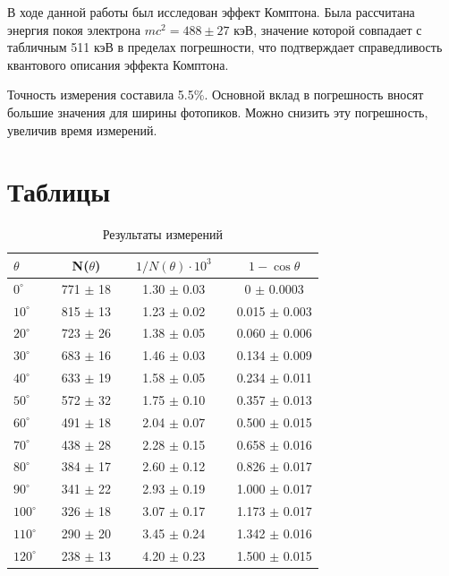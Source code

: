 \documentclass[reprint, nofootinbib, nobalancelastpage, 10pt]{revtex4-2}
\begin{document}
В ходе данной работы был исследован эффект Комптона. Была рассчитана энергия покоя
электрона $mc^2 = 488 \pm 27 \text{ кэВ}$, значение которой совпадает с табличным 511 кэВ
в пределах погрешности, что подтверждает справедливость квантового описания эффекта
Комптона.

Точность измерения составила 5.5\%. Основной вклад в погрешность вносят большие значения
для ширины фотопиков. Можно снизить эту погрешность, увеличив время измерений.


\appendix

\newpage
\section{Таблицы}

\begin{table}[h!]
	\caption{Результаты измерений}
	\label{tab:data}
	\begin{tabular}{lcccccc}
		\toprule
		$\theta$ & {} & N($\theta$) & {} &  $1/N(\theta) \cdot 10^3$ & {} &  $1 - \cos \theta$ \\
		\midrule
		$0^{\circ}$   & {} & 771 $\pm$ 18 & {} & 1.30 $\pm$ 0.03 & {} & 0     $\pm$ 0.0003\\
		$10^{\circ}$  & {} & 815 $\pm$ 13 & {} & 1.23 $\pm$ 0.02 & {} & 0.015 $\pm$ 0.003 \\
		$20^{\circ}$  & {} & 723 $\pm$ 26 & {} & 1.38 $\pm$ 0.05 & {} & 0.060 $\pm$ 0.006 \\
		$30^{\circ}$  & {} & 683 $\pm$ 16 & {} & 1.46 $\pm$ 0.03 & {} & 0.134 $\pm$ 0.009 \\
		$40^{\circ}$  & {} & 633 $\pm$ 19 & {} & 1.58 $\pm$ 0.05 & {} & 0.234 $\pm$ 0.011 \\
		$50^{\circ}$  & {} & 572 $\pm$ 32 & {} & 1.75 $\pm$ 0.10 & {} & 0.357 $\pm$ 0.013 \\
		$60^{\circ}$  & {} & 491 $\pm$ 18 & {} & 2.04 $\pm$ 0.07 & {} & 0.500 $\pm$ 0.015 \\
		$70^{\circ}$  & {} & 438 $\pm$ 28 & {} & 2.28 $\pm$ 0.15 & {} & 0.658 $\pm$ 0.016 \\
		$80^{\circ}$  & {} & 384 $\pm$ 17 & {} & 2.60 $\pm$ 0.12 & {} & 0.826 $\pm$ 0.017 \\
		$90^{\circ}$  & {} & 341 $\pm$ 22 & {} & 2.93 $\pm$ 0.19 & {} & 1.000 $\pm$ 0.017 \\
		$100^{\circ}$ & {} & 326 $\pm$ 18 & {} & 3.07 $\pm$ 0.17 & {} & 1.173 $\pm$ 0.017 \\
		$110^{\circ}$ & {} & 290 $\pm$ 20 & {} & 3.45 $\pm$ 0.24 & {} & 1.342 $\pm$ 0.016 \\
		$120^{\circ}$ & {} & 238 $\pm$ 13 & {} & 4.20 $\pm$ 0.23 & {} & 1.500 $\pm$ 0.015 \\
		\bottomrule
	\end{tabular}
\end{table}
\end{document}
